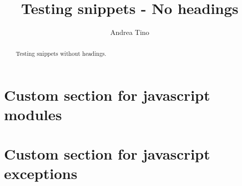 \documentclass{article}
\begin{document}
\title{Testing snippets - No headings}
\author{Andrea Tino}

\maketitle

\begin{abstract}
Testing snippets without headings.
\end{abstract}

\section{Custom section for javascript modules}


\section{Custom section for javascript exceptions}

\end{document}
